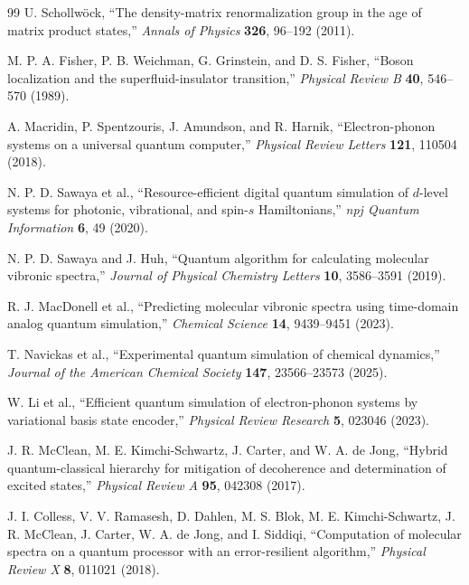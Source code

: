 \documentclass[
  reprint,
  amsmath,
  amssymb,
  aps,
  pra,
  nofootinbib,
  superscriptaddress,
  floatfix
]{revtex4-2}
\begin{document}
\begin{thebibliography}{99}
U. Schollw\"ock,
``The density-matrix renormalization group in the age of matrix product states,''
\emph{Annals of Physics} \textbf{326}, 96--192 (2011).

M. P. A. Fisher, P. B. Weichman, G. Grinstein, and D. S. Fisher,
``Boson localization and the superfluid-insulator transition,''
\emph{Physical Review B} \textbf{40}, 546--570 (1989).

A. Macridin, P. Spentzouris, J. Amundson, and R. Harnik,
``Electron-phonon systems on a universal quantum computer,''
\emph{Physical Review Letters} \textbf{121}, 110504 (2018).

N. P. D. Sawaya et al.,
``Resource-efficient digital quantum simulation of $d$-level systems for photonic, vibrational, and spin-$s$ Hamiltonians,''
\emph{npj Quantum Information} \textbf{6}, 49 (2020).

N. P. D. Sawaya and J. Huh,
``Quantum algorithm for calculating molecular vibronic spectra,''
\emph{Journal of Physical Chemistry Letters} \textbf{10}, 3586--3591 (2019).

R. J. MacDonell et al.,
``Predicting molecular vibronic spectra using time-domain analog quantum simulation,''
\emph{Chemical Science} \textbf{14}, 9439--9451 (2023).

T. Navickas et al.,
``Experimental quantum simulation of chemical dynamics,''
\emph{Journal of the American Chemical Society} \textbf{147}, 23566--23573 (2025).

W. Li et al.,
``Efficient quantum simulation of electron-phonon systems by variational basis state encoder,''
\emph{Physical Review Research} \textbf{5}, 023046 (2023).

J. R. McClean, M. E. Kimchi-Schwartz, J. Carter, and W. A. de Jong,
``Hybrid quantum-classical hierarchy for mitigation of decoherence and determination of excited states,''
\emph{Physical Review A} \textbf{95}, 042308 (2017).

J. I. Colless, V. V. Ramasesh, D. Dahlen, M. S. Blok, M. E. Kimchi-Schwartz, J. R. McClean, J. Carter, W. A. de Jong, and I. Siddiqi,
``Computation of molecular spectra on a quantum processor with an error-resilient algorithm,''
\emph{Physical Review X} \textbf{8}, 011021 (2018).


\end{thebibliography}
\end{document}
